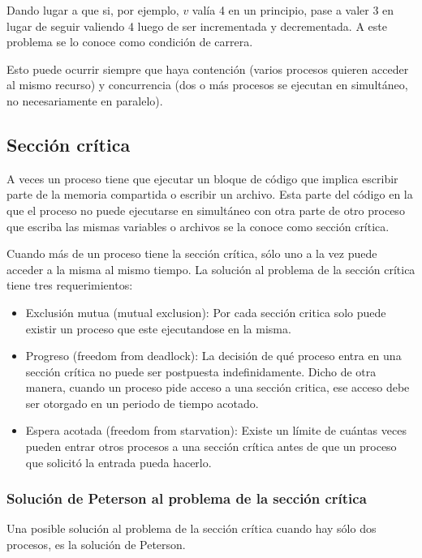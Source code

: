 \documentclass{article}
\begin{document}
Dando lugar a que si, por ejemplo, $v$ val\'ia 4 en un principio, pase a valer 3 en lugar de seguir valiendo 4 luego de ser incrementada y decrementada. A este problema se lo conoce como condici\'on de carrera.

Esto puede ocurrir siempre que haya contenci\'on (varios procesos quieren acceder al mismo recurso) y concurrencia (dos o m\'as procesos se ejecutan en simult\'aneo, no necesariamente en paralelo).

\subsection{Secci\'on cr\'itica}

A veces un proceso tiene que ejecutar un bloque de c\'odigo que implica escribir parte de la memoria compartida o escribir un archivo. Esta parte del c\'odigo en la que el proceso no puede ejecutarse en simult\'aneo con otra parte de otro proceso que escriba las mismas variables o archivos se la conoce como secci\'on cr\'itica.

Cuando m\'as de un proceso tiene la secci\'on cr\'itica, s\'olo uno a la vez puede acceder a la misma al mismo tiempo. La soluci\'on al problema de la secci\'on cr\'itica tiene tres requerimientos:

\begin{itemize}
\item Exclusión mutua (mutual exclusion): Por cada sección critica solo puede existir un proceso que este ejecutandose en la misma.
\item Progreso (freedom from deadlock): La decisi\'on de qu\'e proceso entra en una secci\'on cr\'itica no puede ser postpuesta indefinidamente. Dicho de otra manera, cuando un proceso pide acceso a una sección critica, ese acceso debe ser otorgado en un periodo de tiempo acotado.
\item Espera acotada (freedom from starvation): Existe un l\'imite de cu\'antas veces pueden entrar otros procesos a una sección cr\'itica antes de que un proceso que solicitó la entrada pueda hacerlo.
\end{itemize}

\subsubsection{Soluci\'on de Peterson al problema de la secci\'on cr\'itica}

Una posible soluci\'on al problema de la secci\'on cr\'itica cuando hay s\'olo dos procesos, es la soluci\'on de Peterson.
\end{document}
